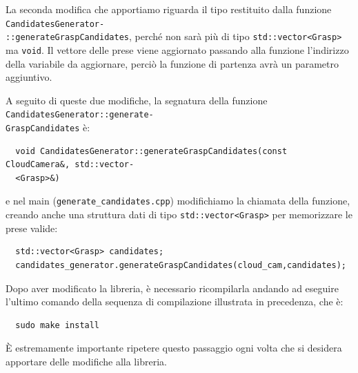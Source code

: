 \documentclass{report}
\begin{document}
La seconda modifica che apportiamo riguarda il tipo restituito dalla funzione \texttt{CandidatesGenerator-}\\\texttt{::generateGraspCandidates}, perché non sarà più di tipo \texttt{std::vector<Grasp>} ma \texttt{void}. Il vettore delle prese viene aggiornato passando alla funzione l'indirizzo della variabile da aggiornare, perciò la funzione di partenza avrà un parametro aggiuntivo. \par 
A seguito di queste due modifiche, la segnatura della funzione \texttt{CandidatesGenerator::generate-}\\\texttt{GraspCandidates} è:
\begin{verbatim}
  void CandidatesGenerator::generateGraspCandidates(const CloudCamera&, std::vector-
  <Grasp>&)
\end{verbatim}
e nel main (\texttt{generate\_candidates.cpp}) modifichiamo la chiamata della funzione, creando anche una struttura dati di tipo \texttt{std::vector<Grasp>} per memorizzare le prese valide:
\begin{verbatim}
  std::vector<Grasp> candidates;
  candidates_generator.generateGraspCandidates(cloud_cam,candidates);
\end{verbatim}
Dopo aver modificato la libreria, è necessario ricompilarla andando ad eseguire l'ultimo comando della sequenza di compilazione illustrata in precedenza, che è: 
\begin{verbatim}
  sudo make install
\end{verbatim}
È estremamente importante ripetere questo passaggio ogni volta che si desidera apportare delle modifiche alla libreria.
\end{document}
